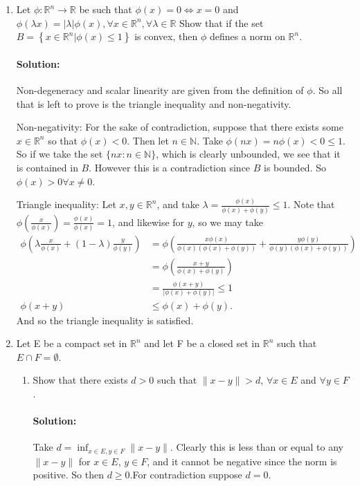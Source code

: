 \documentclass{article}
\begin{document}
\begin{enumerate} 

\item Let $\phi : \mathbb{R}^n \to \mathbb{R}$ be such that $\phi(x) = 0 \Leftrightarrow x = 0$ and $\phi(\lambda x) = |\lambda| \phi(x), \forall x \in \mathbb{R}^n, \forall \lambda \in \mathbb{R}$  Show that if the set $B = \left\{x \in \mathbb{R}^n | \phi(x) \leq 1 \right\}$ is convex, then $\phi$ defines a norm on $\mathbb{R}^n$. 
\paragraph{Solution: }Non-degeneracy and scalar linearity are given from the definition of $\phi$. So all that is left to prove is the triangle inequality and non-negativity.

Non-negativity: For the sake of contradiction, suppose that there exists some $x\in \mathbb{R}^{n}$ so that $\phi(x)<0$. Then let $n\in \mathbb{N}$. Take $\phi(nx)=n\phi(x)<0\leq 1$. So if we take the set $\{nx:n\in \mathbb{N}\} $, which is clearly unbounded, we see that it is contained in $B$. However this is a contradiction since $B$ is bounded. So $\phi(x)>0\forall x\neq 0$.

Triangle inequality: Let $x,y\in \mathbb{R}^{n}$, and take $\lambda= \frac{\phi(x)}{\phi(x)+\phi(y)}\leq 1$. Note that $\phi\left( \frac{x}{\phi(x)} \right) =\frac{\phi (x)}{\phi(x)}=1$, and likewise for $y$, so we may take
\begin{align*}
    \phi\left( \lambda \frac{x}{\phi(x)}+(1-\lambda) \frac{y}{\phi(y)} \right) 
    &= \phi\left(  \frac{x\phi(x)}{\phi(x)(\phi(x)+\phi(y))}+ \frac{y\phi(y)}{\phi(y)(\phi(x)+\phi(y))}\right)  \\
    &= \phi\left( \frac{x+y}{\phi(x)+\phi(y)} \right)  \\
    &= \frac{\phi(x+y)}{|\phi(x)+\phi(y)|}\leq 1 \\
    \phi(x+y)&\leq\phi(x)+\phi(y)
.\end{align*}
And so the triangle inequality is satisfied.

\item Let E be a compact set in $\mathbb{R}^n$ and let F be a closed set in $\mathbb{R}^n$ such that $E \cap F = \emptyset$.  

\begin{enumerate}[label= (\alph*)] 
    \item Show that there exists $d > 0$ such that $\|x - y\| > d$, $\forall x \in E$ and $\forall y \in F$.  
        \paragraph{Solution: }Take $d=\inf_{x\in E,y\in F}\|x-y\|$. Clearly this is less than or equal to any $\|x-y\|$ for $x\in E$, $y\in F$, and it cannot be negative since the norm is positive. So then $d\geq 0$.For contradiction suppose $d=0$. 


\end{enumerate}
\end{enumerate}
\end{document}
